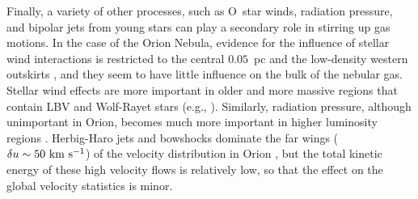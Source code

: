 \documentclass[useAMS,usenatbib]{mn2e}
\begin{document}
Finally, a variety of other processes, such as O~star winds, radiation
pressure, and bipolar jets from young stars can play a secondary role
in stirring up gas motions.  In the case of the Orion Nebula, evidence
for the influence of stellar wind interactions is restricted to the
central \(0.05\)~pc \citep{Garcia-Arredondo:2001a} and the low-density
western outskirts \citep{Gudel:2008a}, and they seem to have little
influence on the bulk of the nebular gas.  Stellar wind effects are
more important in older and more massive regions that contain LBV and
Wolf-Rayet stars (e.g., \citealp{Smith:2007a}).  Similarly, radiation
pressure, although unimportant in Orion, becomes much more important
in higher luminosity regions \citep{Krumholz:2009a}.  Herbig-Haro jets
and bowshocks dominate the far wings (\(\delta u \sim 50~\mathrm{km\ s^{-1}}\)) of
the velocity distribution in Orion \citep{Henney:2007b}, but the total
kinetic energy of these high velocity flows is relatively low, so that
the effect on the global velocity statistics is minor.



\end{document}
